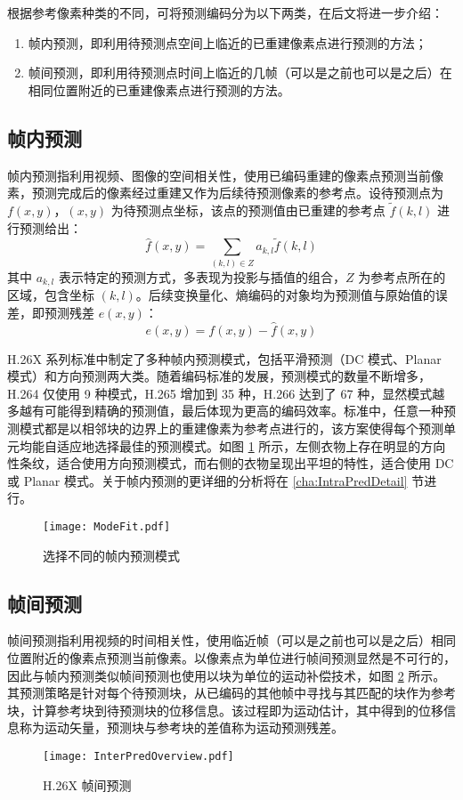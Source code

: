 根据参考像素种类的不同，可将预测编码分为以下两类，在后文将进一步介绍：
\begin{enumerate}
    \item 帧内预测，即利用待预测点空间上临近的已重建像素点进行预测的方法；
    \item 帧间预测，即利用待预测点时间上临近的几帧（可以是之前也可以是之后）在相同位置附近的已重建像素点进行预测的方法。
\end{enumerate}

\subsection{帧内预测}
帧内预测指利用视频、图像的空间相关性，使用已编码重建的像素点预测当前像素，预测完成后的像素经过重建又作为后续待预测像素的参考点。设待预测点为 $f(x,y)$，$(x,y)$ 为待预测点坐标，该点的预测值由已重建的参考点 $\widetilde{f}(k,l)$ 进行预测给出：
\begin{equation}
    \widehat{f}(x,y) = \sum_{(k,l)\in Z}a_{k,l}\widetilde{f}(k,l)
\end{equation}
其中 $a_{k,l}$ 表示特定的预测方式，多表现为投影与插值的组合，$Z$ 为参考点所在的区域，包含坐标 $(k,l)$。后续变换量化、熵编码的对象均为预测值与原始值的误差，即预测残差 $e(x,y)$：
\begin{equation}
    e(x,y) = f(x,y) - \widehat{f}(x,y)
\end{equation}

H.26X 系列标准中制定了多种帧内预测模式，包括平滑预测（DC 模式、Planar 模式）和方向预测两大类。随着编码标准的发展，预测模式的数量不断增多，H.264 仅使用 9 种模式，H.265 增加到 35 种，H.266 达到了 67 种，显然模式越多越有可能得到精确的预测值，最后体现为更高的编码效率。标准中，任意一种预测模式都是以相邻块的边界上的重建像素为参考点进行的，该方案使得每个预测单元均能自适应地选择最佳的预测模式。如图 \ref{fig:ModeFit} 所示，左侧衣物上存在明显的方向性条纹，适合使用方向预测模式，而右侧的衣物呈现出平坦的特性，适合使用 DC 或 Planar 模式。关于帧内预测的更详细的分析将在 \ref{cha:IntraPredDetail} 节进行。
\begin{figure}[htb]
    \centering
    \texttt{[image: ModeFit.pdf]}
    \caption{选择不同的帧内预测模式}
    \label{fig:ModeFit}
\end{figure}

\subsection{帧间预测}
帧间预测指利用视频的时间相关性，使用临近帧（可以是之前也可以是之后）相同位置附近的像素点预测当前像素。以像素点为单位进行帧间预测显然是不可行的，因此与帧内预测类似帧间预测也使用以块为单位的运动补偿技术，如图 \ref{fig:InterPredOverview} 所示。其预测策略是针对每个待预测块，从已编码的其他帧中寻找与其匹配的块作为参考块，计算参考块到待预测块的位移信息。该过程即为运动估计，其中得到的位移信息称为运动矢量，预测块与参考块的差值称为运动预测残差。
\begin{figure}[htb]
    \centering
    \texttt{[image: InterPredOverview.pdf]}
    \caption{H.26X 帧间预测}
    \label{fig:InterPredOverview}
\end{figure}

